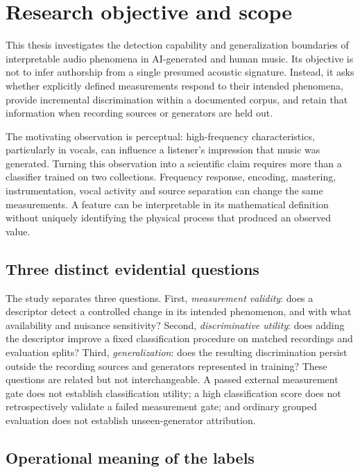 \section{Research objective and scope}
\label{sec:final-research-objective}

This thesis investigates the detection capability and generalization
boundaries of interpretable audio phenomena in AI-generated and human music.
Its objective is not to infer authorship from a single presumed acoustic
signature. Instead, it asks whether explicitly defined measurements respond
to their intended phenomena, provide incremental discrimination within a
documented corpus, and retain that information when recording sources or
generators are held out.

The motivating observation is perceptual: high-frequency characteristics,
particularly in vocals, can influence a listener's impression that music was
generated. Turning this observation into a scientific claim requires more
than a classifier trained on two collections. Frequency response, encoding,
mastering, instrumentation, vocal activity and source separation can change
the same measurements. A feature can be interpretable in its mathematical
definition without uniquely identifying the physical process that produced
an observed value.

\subsection{Three distinct evidential questions}
\label{sec:three-evidence-levels}

The study separates three questions. First, \emph{measurement validity}:
does a descriptor detect a controlled change in its intended phenomenon,
and with what availability and nuisance sensitivity? Second,
\emph{discriminative utility}: does adding the descriptor improve a fixed
classification procedure on matched recordings and evaluation splits?
Third, \emph{generalization}: does the resulting discrimination persist
outside the recording sources and generators represented in training?
These questions are related but not interchangeable. A passed external
measurement gate does not establish classification utility; a high
classification score does not retrospectively validate a failed measurement
gate; and ordinary grouped evaluation does not establish unseen-generator
attribution.

\subsection{Operational meaning of the labels}


